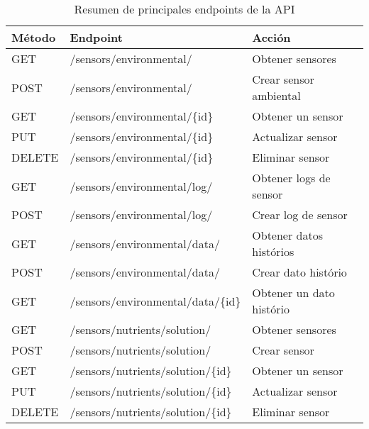 \begin{table}[H]
    \centering
    \caption[Resumen de principales endpoints de la API]{Resumen de principales endpoints de la API}
    \begin{tabular}{l l l}
        \toprule
        \textbf{Método} & \textbf{Endpoint}                       & \textbf{Acción}          \\
        \midrule
        GET             & /sensors/environmental/                 & Obtener sensores         \\
        POST            & /sensors/environmental/                 & Crear sensor ambiental   \\
        GET             & /sensors/environmental/\{id\}           & Obtener un sensor        \\
        PUT             & /sensors/environmental/\{id\}           & Actualizar sensor        \\
        DELETE          & /sensors/environmental/\{id\}           & Eliminar sensor          \\
        \midrule
        GET             & /sensors/environmental/log/             & Obtener logs de sensor   \\
        POST            & /sensors/environmental/log/             & Crear log de sensor      \\
        \midrule
        GET             & /sensors/environmental/data/            & Obtener datos histórios  \\
        POST            & /sensors/environmental/data/            & Crear dato histório      \\
        GET             & /sensors/environmental/data/\{id\}      & Obtener un dato histório \\
        \midrule
        GET             & /sensors/nutrients/solution/            & Obtener sensores         \\
        POST            & /sensors/nutrients/solution/            & Crear sensor             \\
        GET             & /sensors/nutrients/solution/\{id\}      & Obtener un sensor        \\
        PUT             & /sensors/nutrients/solution/\{id\}      & Actualizar sensor        \\
        DELETE          & /sensors/nutrients/solution/\{id\}      & Eliminar sensor          \\
        \midrule

\end{tabular}
\end{table}
